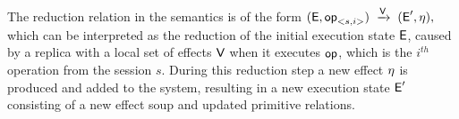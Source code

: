 The reduction relation in the semantics is of the form
{\scriptsize $
({\normalfont \textsf{E}},{\normalfont \textsf{op}}_{<s,i>}) \;\xrightarrow{{\normalfont \textsf{V}}}\; ({\normalfont \textsf{E}}', \eta),
$}
which can be interpreted as the reduction of the initial execution state
${\normalfont \textsf{E}}$, caused by a replica with a local 
set of effects ${\normalfont \textsf{V}}$ when it executes
${\normalfont \textsf{op}}$, which is the $i^{th}$ operation from the session $s$. 
During this reduction step a new effect $\eta$ is produced and added to
the system, resulting in a new execution state ${\normalfont \textsf{E}}'$ consisting of a new effect
soup and updated primitive relations.





